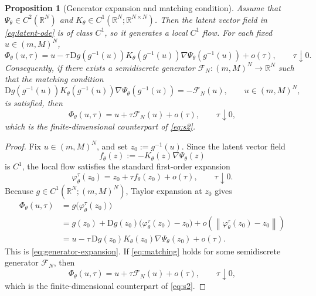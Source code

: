 \documentclass[11pt]{article}
\newtheorem{proposition}{Proposition}
\newcommand{\R}{\mathbb{R}}
\newcommand{\cFN}{\mathcal{F}_N}
\newcommand{\PhiT}{\Phi_{\theta}}
\newcommand{\norm}[1]{\left\lVert #1 \right\rVert}
\begin{document}
\begin{proposition}[Generator expansion and matching condition]\label{prop:generator}
Assume that \(\Psi_{\theta}\in C^2(\R^N)\) and \(K_{\theta}\in C^1(\R^N;\R^{N\times N})\). Then the latent vector field in \eqref{eq:latent-ode} is of class \(C^1\), so it generates a local \(C^1\) flow. For each fixed \(u\in (m,M)^N\),
\begin{equation}\label{eq:generator-expansion}
\PhiT(u,\tau)=u-\tau\,\mathrm{D}g(g^{-1}(u))K_{\theta}(g^{-1}(u))\nabla \Psi_{\theta}(g^{-1}(u))+o(\tau), \qquad \tau\downarrow 0.
\end{equation}
Consequently, if there exists a semidiscrete generator \(\cFN:(m,M)^N\to \R^N\) such that the matching condition
\begin{equation}\label{eq:matching}
\mathrm{D}g(g^{-1}(u))K_{\theta}(g^{-1}(u))\nabla \Psi_{\theta}(g^{-1}(u))=-\cFN(u), \qquad u\in (m,M)^N,
\end{equation}
is satisfied, then
\begin{equation*}
\PhiT(u,\tau)=u+\tau\cFN(u)+o(\tau), \qquad \tau\downarrow 0,
\end{equation*}
which is the finite-dimensional counterpart of \eqref{eq:s2}.
\end{proposition}

\begin{proof}
Fix \(u\in (m,M)^N\), and set \(z_0:=g^{-1}(u)\). Since the latent vector field
\begin{equation*}
f_{\theta}(z):=-K_{\theta}(z)\nabla \Psi_{\theta}(z)
\end{equation*}
is \(C^1\), the local flow satisfies the standard first-order expansion
\begin{equation*}
\varphi_{\theta}^{\tau}(z_0)=z_0+\tau f_{\theta}(z_0)+o(\tau), \qquad \tau\downarrow 0.
\end{equation*}
Because \(g\in C^1(\R^N;(m,M)^N)\), Taylor expansion at \(z_0\) gives
\begin{align*}
\PhiT(u,\tau)
&=g\bigl(\varphi_{\theta}^{\tau}(z_0)\bigr) \\
&=g(z_0)+\mathrm{D}g(z_0)\bigl(\varphi_{\theta}^{\tau}(z_0)-z_0\bigr)+o\!\left(\norm{\varphi_{\theta}^{\tau}(z_0)-z_0}\right) \\
&=u-\tau\,\mathrm{D}g(z_0)K_{\theta}(z_0)\nabla\Psi_{\theta}(z_0)+o(\tau).
\end{align*}
This is \eqref{eq:generator-expansion}. If \eqref{eq:matching} holds for some semidiscrete generator \(\cFN\), then
\begin{equation*}
\PhiT(u,\tau)=u+\tau\cFN(u)+o(\tau), \qquad \tau\downarrow 0,
\end{equation*}
which is the finite-dimensional counterpart of \eqref{eq:s2}.
\end{proof}
\end{document}
